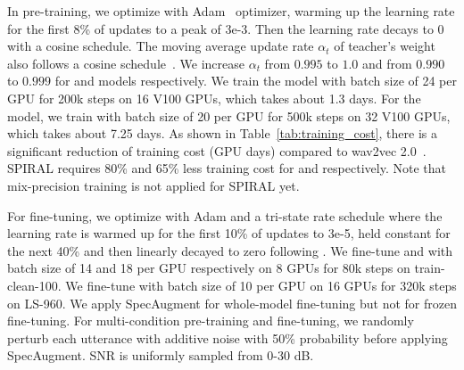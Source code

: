  \begin{table}[t]
   \caption{Comparison of pre-training cost between  wav2vec 2.0 and SPIRAL.}
   \label{tab:training_cost}
   \centering
  \end{table}
  
In pre-training, we optimize with Adam~\citep{kingma2017adam} optimizer, warming up the learning rate for the first 8\% of updates to a peak of 3e-3. Then the learning rate decays to 0 with a cosine schedule. The moving average update rate $\alpha_t$ of teacher's weight also follows a cosine schedule~\citep{Grill2020}. %
We increase $\alpha_t$ from $0.995$ to $1.0$ and from $0.990$ to $0.999$ for \tscbase{}  and \tscbig{} models respectively.
We train the \tscbase{} model with batch size of 24 per GPU for 200k steps on 16 V100 GPUs, which takes about 1.3 days.
For the \tscbig{} model, we train with batch size of 20 per GPU for 500k steps on 32 V100 GPUs, which takes about 7.25 days.
As shown in Table~\ref{tab:training_cost}, there is a significant reduction of training cost (GPU days) compared to wav2vec 2.0~\citep{wav2vec2}. SPIRAL requires 80\% and 65\% less training cost for \tscbase{} and \tscbig{} respectively.
Note that mix-precision training is not applied for SPIRAL yet. %

For fine-tuning, we optimize with Adam and a tri-state rate schedule where the learning rate is warmed up for the first
10\% of updates to 3e-5, held constant for the next 40\% and then linearly decayed to zero following \citet{wav2vec2}. We fine-tune \tscbase{} and \tscbig{} with batch size of 14 and 18 per GPU respectively on 8 GPUs for 80k steps on train-clean-100. We fine-tune \tscbig{} with batch size of 10 per GPU on 16 GPUs for 320k steps on LS-960. We apply SpecAugment for whole-model fine-tuning but not for frozen fine-tuning.
For multi-condition pre-training and fine-tuning, 
we randomly perturb each utterance with additive noise with 50\% probability before applying SpecAugment. SNR is uniformly sampled from 0-30 dB. 

